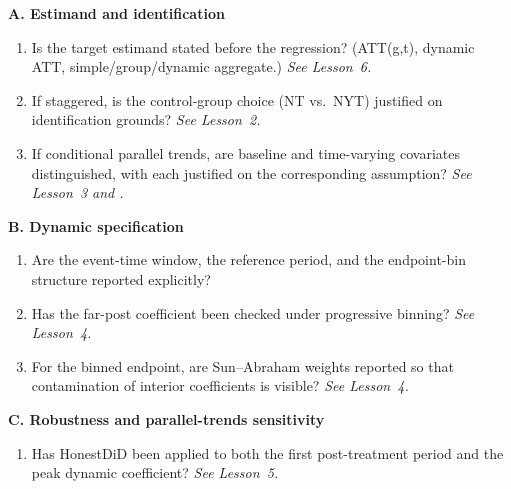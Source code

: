 \documentclass[11pt]{article}
\begin{document}
\begin{tcolorbox}[
  colback=gray!5,
  colframe=black!70,
  arc=1mm,
  boxrule=0.5pt,
  left=3pt,right=3pt,top=6pt,bottom=6pt,
  title={\textbf{Box 4.1. Pre-Submission DiD Checklist}},
  fonttitle=\small\bfseries,
  coltitle=black,
  colbacktitle=gray!15
]
\footnotesize

\textbf{A. Estimand and identification}

\vspace{0.3em}
\begin{enumerate}[leftmargin=1.6em,itemsep=0.25em,label=\arabic*.]
\item Is the target estimand stated before the regression? (ATT(g,t), dynamic ATT, simple/group/dynamic aggregate.) \textit{See Lesson~6.}

\item If staggered, is the control-group choice (NT vs.\ NYT) justified on identification grounds? \textit{See Lesson~2.}

\item If conditional parallel trends, are baseline and time-varying covariates distinguished, with each justified on the corresponding assumption? \textit{See Lesson~3 and \textcite{caetano2022difference}.}
\end{enumerate}

\textbf{B. Dynamic specification}

\vspace{0.3em}
\begin{enumerate}[leftmargin=1.6em,itemsep=0.25em,label=\arabic*.,start=4]
\item Are the event-time window, the reference period, and the endpoint-bin structure reported explicitly?

\item Has the far-post coefficient been checked under progressive binning? \textit{See Lesson~4.}

\item For the binned endpoint, are Sun--Abraham weights reported so that contamination of interior coefficients is visible? \textit{See Lesson~4.}
\end{enumerate}

\textbf{C. Robustness and parallel-trends sensitivity}

\vspace{0.3em}
\begin{enumerate}[leftmargin=1.6em,itemsep=0.25em,label=\arabic*.,start=7]
\item Has HonestDiD been applied to both the first post-treatment period and the peak dynamic coefficient? \textit{See Lesson~5.}


\end{enumerate}
\end{tcolorbox}
\end{document}
